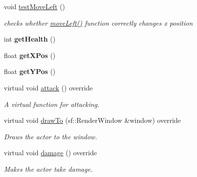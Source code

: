 \begin{DoxyCompactItemize}
\mbox{\label{classRose_1_1Character_1_1MainCharacter_ac0c5f59dd73eeffe3c6a1b58b6793bee}} 
void \mbox{\hyperlink{classRose_1_1Character_1_1MainCharacter_ac0c5f59dd73eeffe3c6a1b58b6793bee}{test\+Move\+Left}} ()
\begin{DoxyCompactList}\small\item\em checks whether \mbox{\hyperlink{classRose_1_1Character_1_1MainCharacter_a80dd452d836ec63345c0afbfff664a7e}{move\+Left()}} function correctly changes x position \end{DoxyCompactList}\item 
\mbox{\label{classRose_1_1Character_1_1MainCharacter_a01927e240e68db97ee543d29cb21bef3}} 
int {\bfseries get\+Health} ()
\item 
\mbox{\label{classRose_1_1Character_1_1MainCharacter_a349d611496a70a3d7f03229d611a77d5}} 
float {\bfseries get\+X\+Pos} ()
\item 
\mbox{\label{classRose_1_1Character_1_1MainCharacter_a2f2ccb5e32493ac0db280691a7f423da}} 
float {\bfseries get\+Y\+Pos} ()
\item 
virtual void \mbox{\hyperlink{classRose_1_1Character_1_1MainCharacter_aec29206b632fb2bfe77af3e9f48835b4}{attack}} () override
\begin{DoxyCompactList}\small\item\em A virtual function for attacking. \end{DoxyCompactList}\item 
virtual void \mbox{\hyperlink{classRose_1_1Character_1_1MainCharacter_a6c30ae81a27fa3cc5fff16ebe7c9f8be}{draw\+To}} (sf\+::\+Render\+Window \&window) override
\begin{DoxyCompactList}\small\item\em Draws the actor to the window. \end{DoxyCompactList}\item 
virtual void \mbox{\hyperlink{classRose_1_1Character_1_1MainCharacter_a95fd982ce2de2f75067e68fc4ec49fdc}{damage}} () override
\begin{DoxyCompactList}\small\item\em Makes the actor take damage. \end{DoxyCompactList}\end{DoxyCompactItemize}
